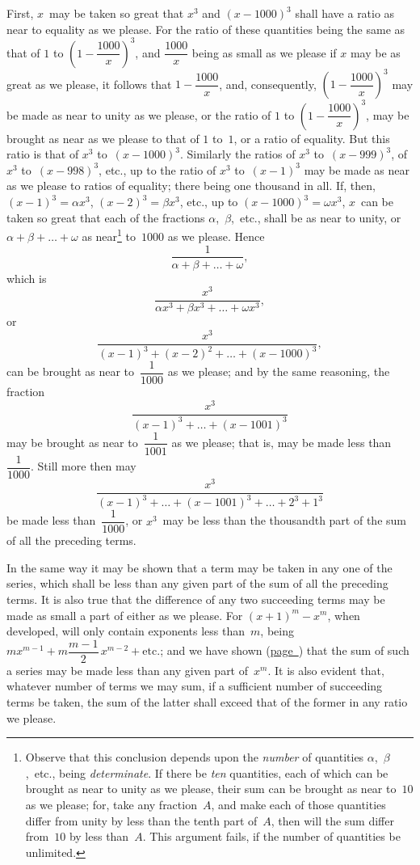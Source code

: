 \documentclass[12pt]{book}[2005/09/16]
\newcommand{\Chg}[2]{#2}
\newcommand{\Add}[1]{\Chg{}{#1}}
\newcommand{\Pagelabel}[1]{\phantomsection\label{page:#1}}
\newcommand{\PageSep}[1]{\Pagelabel{#1}\ignorespaces}
\newcommand{\PageRef}[2][page]{\hyperref[page:#2]{#1~\pageref*{page:#2}}}
\renewcommand{\etc}{\text{etc}}
\renewcommand{\(}{{\upshape(}}
\renewcommand{\)}{{\upshape)}}
\begin{document}
First, $x$~may be taken so great that $x^{3}$ and $(x - 1000)^{3}$
shall have a ratio as near to equality as we
please. For the ratio of these quantities being the
same as that of $1$ to $\left(1 - \dfrac{1000}{x}\right)^{3}$, and $\dfrac{1000}{x}$ being as
small as we please if $x$ may be as great as we please, it
follows that $1 - \dfrac{1000}{x}$, and, consequently, $\left(1 - \dfrac{1000}{x}\right)^{3}$
may be made as near to unity as we please, or the
ratio of $1$ to $\left(1 - \dfrac{1000}{x}\right)^{3}$, may be brought as near as
we please to that of $1$ to~$1$, or a ratio of equality. But
this ratio is that of $x^{3}$ to~$(x - 1000)^{3}$. Similarly the
ratios of $x^{3}$ to~$(x - 999)^{3}$, of $x^{3}$ to~$(x - 998)^{3}$, etc., up
to the ratio of $x^{3}$ to~$(x - 1)^{3}$ may be made as near as
we please to ratios of equality; there being one thousand
in all. If, then, $(x - 1)^{3} = \alpha x^{3}$, $(x - 2)^{3} = \beta x^{3}$,
etc., up to $(x - 1000)^{3} = \omega x^{3}$, $x$~can be taken so great
that each of the fractions $\alpha$,~$\beta$,~etc., shall be as near
to unity, or $\alpha + \beta + \dots + \omega$ as near\footnote
  {Observe that this conclusion depends upon the \emph{number} of quantities $\alpha$,~$\beta$,~etc.,
  being \emph{determinate}. If there be \emph{ten} quantities, each of which can be
  brought as near to unity as we please, their sum can be brought as near to~$10$
  as we please; for, take any fraction~$A$, and make each of those quantities
  differ from unity by less than the tenth part of~$A$, then will the sum differ
  from~$10$ by less than~$A$. This argument fails, if the number of quantities be
  unlimited.}
to~$1000$ as we
please. Hence
\[
\frac{1}{\alpha + \beta + \dots + \omega}\Add{,}
\]
which is
\[
\frac{x^{3}}{\alpha x^{3} + \beta x^{3} + \dots + \omega x^{3}},
\]
or
\[
\frac{x^{3}}{(x - 1)^{3} + (x - 2)^{2} + \dots + (x - 1000)^{3}},
\]
\PageSep{70}
can be brought as near to~$\dfrac{1}{1000}$ as we please; and by
the same reasoning, the fraction
\[
\frac{x^{3}}{(x - 1)^{3} + \dots + (x - 1001)^{3}}
\]
may be brought as near to~$\dfrac{1}{1001}$ as we please; that is,
may be made less than~$\dfrac{1}{1000}$. Still more then may
\[
\frac{x^{3}}{(x - 1)^{3} + \dots + (x - 1001)^{3} + \dots + 2^{3} + 1^{3}}
\]
be made less than~$\dfrac{1}{1000}$, or $x^{3}$~may be less than the
thousandth part of the sum of all the preceding terms.

In the same way it may be shown that a term may
be taken in any one of the series, which shall be less
than any given part of the sum of all the preceding
terms. It is also true that the difference of any two
succeeding terms may be made as small a part of
either as we please. For $(x + 1)^{m} - x^{m}$, when developed,
will only contain exponents less than~$m$, being
$mx^{m-1} + m\dfrac{m - 1}{2}\, x^{m-2} + \etc.$; and we have shown
(\PageRef{66}) that the sum of such a series may be made
less than any given part of~$x^{m}$. It is also evident
that, whatever number of terms we may sum, if a
sufficient number of succeeding terms be taken, the
sum of the latter shall exceed that of the former in
any ratio we please.
\end{document}

